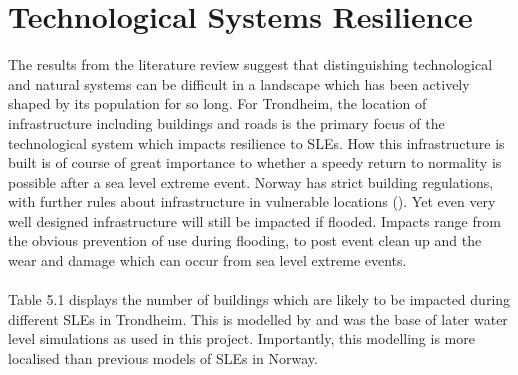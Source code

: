 \section{Technological Systems Resilience}
The results from the literature review suggest that distinguishing technological and natural systems can be difficult in a landscape which has been actively shaped by its population for so long. For Trondheim, the location of infrastructure including buildings and roads is the primary focus of the technological system which impacts resilience to SLEs. How this infrastructure is built is of course of great importance to whether a speedy return to normality is possible after a sea level extreme event. Norway has strict building regulations, with further rules about infrastructure in vulnerable locations (\cite{direktoratet_for_byggkvalitet_direktoratet_nodate}). Yet even very well designed infrastructure will still be impacted if flooded. Impacts range from the obvious  prevention of use during flooding, to post event clean up and the wear and damage which can occur from sea level extreme events.
\paragraph{}
Table 5.1 displays the number of buildings which are likely to be impacted during different SLEs in Trondheim. This is modelled by \cite{kartverket_se_2021} and was the base of later water level simulations as used in this project. Importantly, this modelling is more localised than previous models of SLEs in Norway.


